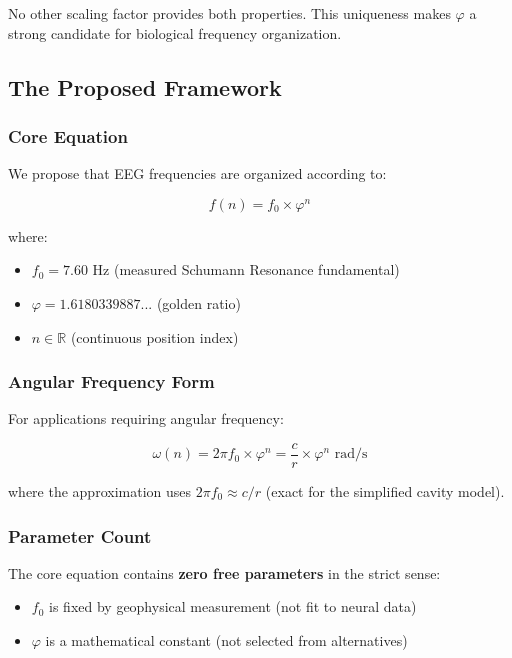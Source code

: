 \documentclass[11pt,a4paper]{article}
\newcommand{\phisym}{\varphi}
\newcommand{\fzero}{f_0}
\begin{document}
No other scaling factor provides both properties. This uniqueness makes $\phisym$ a strong candidate for biological frequency organization.

\subsection{The Proposed Framework}

\subsubsection{Core Equation}

We propose that EEG frequencies are organized according to:

\begin{keyequation}
\begin{equation}
f(n) = \fzero \times \phisym^n
\label{eq:core}
\end{equation}

where:
\begin{itemize}
    \item $\fzero = 7.60$ Hz (measured Schumann Resonance fundamental)
    \item $\phisym = 1.6180339887...$ (golden ratio)
    \item $n \in \mathbb{R}$ (continuous position index)
\end{itemize}
\end{keyequation}

\subsubsection{Angular Frequency Form}

For applications requiring angular frequency:

\begin{equation}
\omega(n) = 2\pi \fzero \times \phisym^n = \frac{c}{r} \times \phisym^n \text{ rad/s}
\label{eq:omega}
\end{equation}

where the approximation uses $2\pi \fzero \approx c/r$ (exact for the simplified cavity model).

\subsubsection{Parameter Count}

The core equation contains \textbf{zero free parameters} in the strict sense:

\begin{itemize}
    \item $\fzero$ is fixed by geophysical measurement (not fit to neural data)
    \item $\phisym$ is a mathematical constant (not selected from alternatives)
\end{itemize}
\end{document}
